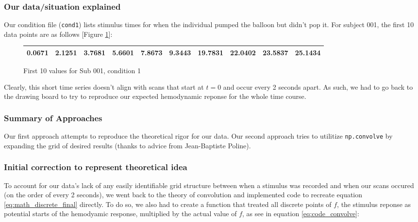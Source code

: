 \documentclass[11pt]{article}
\begin{document}
\subsubsection{Our data/situation explained}
Our condition file (\texttt{cond1}) lists stimulus times for when the 
individual pumped the balloon but didn't pop it. For subject 001, the 
first 10 data points are as follows [Figure \ref{table:cond1}]:

\vspace{5mm}

\begin{figure}[ht]
\begin{center}
\begin{tabular}{|cccccccccc|}
  \hline
0.0671 &
2.1251 &
3.7681 &
5.6601 &
7.8673 &
9.3443 &
19.7831 &
22.0402 &
23.5837 &
25.1434 \\
 \hline

  \end{tabular}
   \caption{First 10 values for Sub 001, condition 1}
  \label{table:cond1}
\end{center}
\end{figure}
 
Clearly, this short time series doesn't align with scans that start at 
$t=0$ and occur every 2 seconds apart. As such, we had to go back to the 
drawing board to try to reproduce our expected hemodynamic reponse for the 
whole time course.



\subsubsection{Summary of Approaches}
Our first approach attempts to reproduce the theoretical rigor for our data. 
Our second approach tries to utilitize \texttt{np.convolve} by expanding the 
grid of desired results (thanks to advice from Jean-Baptiste Poline).




\subsubsection{Initial correction to represent theoretical idea}
To account for our data's lack of any easily identifiable grid structure 
between when a stimulus was recorded and when our scans occured (on the 
order of every 2 seconds), we went back to the theory of convolution and 
implemented code to recreate equation \ref{eq:math_discrete_final} directly. 
To do so, we also had to create a function that treated all discrete points 
of $f$, the stimulus reponse as potential starts of the hemodyamic response, 
multiplied by the actual value of $f$, as see in equation 
\ref{eq:code_convolve}:
\end{document}
